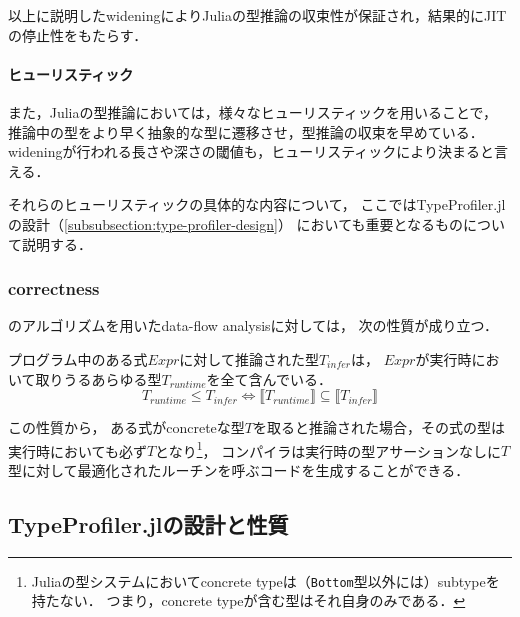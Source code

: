 以上に説明したwideningによりJuliaの型推論の収束性が保証され，結果的にJITの停止性をもたらす．

\paragraph{ヒューリスティック} \label{paragraph:inference-heuristic}

また，Juliaの型推論においては，様々なヒューリスティックを用いることで，
推論中の型をより早く抽象的な型に遷移させ，型推論の収束を早めている．
wideningが行われる長さや深さの閾値も，ヒューリスティックにより決まると言える．

それらのヒューリスティックの具体的な内容について，
ここではTypeProfiler.jlの設計（\ref{subsubsection:type-profiler-design}）
においても重要となるものについて説明する．


\subsubsection{correctness} \label{subsubsection:inference-correctness}

\cite{graph-free-data-flow-analysis}のアルゴリズムを用いたdata-flow analysisに対しては，
次の性質が成り立つ\cite{jeff-master}．


\begin{theorem*}[correctness]
  \label{theorem:inference-correctness}
  プログラム中のある式\(Expr\)に対して推論された型\(T_{infer}\)は，
  \(Expr\)が実行時において取りうるあらゆる型\(T_{runtime}\)を全て含んでいる．
  \[
    T_{runtime} \leq T_{infer} \Leftrightarrow \llbracket T_{runtime} \rrbracket \subseteq \llbracket T_{infer} \rrbracket
  \]
\end{theorem*}

この性質から，
ある式がconcreteな型\(T\)を取ると推論された場合，その式の型は実行時においても必ず\(T\)となり\footnote{
  Juliaの型システムにおいてconcrete typeは（\texttt{Bottom}型以外には）subtypeを持たない．
  つまり，concrete typeが含む型はそれ自身のみである．
}，
コンパイラは実行時の型アサーションなしに\(T\)型に対して最適化されたルーチンを呼ぶコードを生成することができる．

\subsection{TypeProfiler.jlの設計と性質} \label{subsection:type-profiler-design-and-property}

